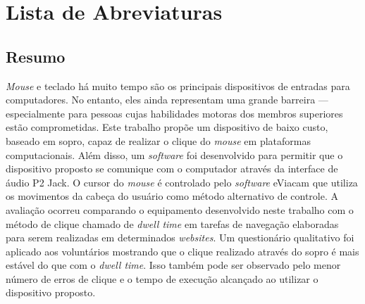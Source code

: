 \documentclass{ufpatcc}
\begin{document}

\listoffigures 
{} 
\clearpage

\listoftables 
{} 
\clearpage

\chapter*{Lista de Abreviaturas} \label{sec:siglas}
 \label{sec:siglas} 
\clearpage




\begin{ufpaResumo}
\chapter*{Resumo}
\textit{Mouse} e teclado há muito tempo são os principais dispositivos de
entradas para computadores. No entanto, eles ainda representam uma grande
barreira --- especialmente para pessoas cujas habilidades motoras dos membros
superiores estão comprometidas. Este trabalho propõe um dispositivo de baixo
custo, baseado em sopro, capaz de realizar o clique do \textit{mouse} em
plataformas computacionais. Além disso, um \textit{software} foi desenvolvido
para permitir que o dispositivo proposto se comunique com o computador através
da interface de áudio P2 Jack. O cursor do \textit{mouse} é controlado pelo
\textit{software} eViacam que utiliza os movimentos da cabeça do usuário como
método alternativo de controle. A avaliação ocorreu comparando o equipamento
desenvolvido neste trabalho com o método de clique chamado de \textit{dwell
time} em tarefas de navegação elaboradas para serem realizadas em determinados
\textit{websites}. Um questionário qualitativo foi aplicado aos voluntários
mostrando que o clique realizado através do sopro é mais estável do que com o
\textit{dwell time}. Isso também pode ser observado pelo menor número de erros
de clique e o tempo de execução alcançado ao utilizar o dispositivo proposto.
\end{ufpaResumo}
\end{document}
